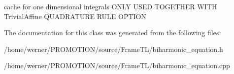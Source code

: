 cache for one dimensional integrals ONLY USED TOGETHER WITH TrivialAffine QUADRATURE RULE OPTION 

The documentation for this class was generated from the following files:\begin{CompactItemize}
\item 
/home/werner/PROMOTION/source/FrameTL/biharmonic\_\-equation.h\item 
/home/werner/PROMOTION/source/FrameTL/biharmonic\_\-equation.cpp\end{CompactItemize}
